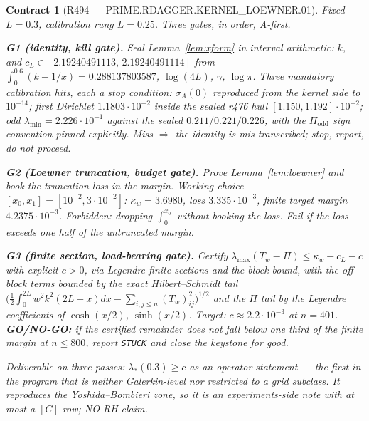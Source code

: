\documentclass[11pt]{article}
\newtheorem{contract}{Contract}
\theoremstyle{remark}
\begin{document}
\begin{contract}[R494 --- PRIME.RDAGGER.KERNEL\_LOEWNER.01]
Fixed $L=0.3$, calibration rung $L=0.25$.
Three gates, in order, A-first.

\textbf{G1 (identity, kill gate).}
Seal Lemma~\ref{lem:xform} in interval arithmetic:
$k$, and
$c_L\in[2.19240491113,\,2.19240491114]$
from $\int_0^{0.6}(k-1/x)=0.288137803587$,
$\log(4L)$, $\gamma$, $\log\pi$.
Three mandatory calibration hits, each a stop condition:
$\sigma_A(0)$ reproduced from the kernel side to $10^{-14}$;
first Dirichlet $1.1803\cdot10^{-2}$ inside the sealed r476
hull $[1.150,1.192]\cdot10^{-2}$;
odd $\lambda_{\min}=2.226\cdot10^{-1}$ against the sealed
$0.211/0.221/0.226$, with the $\Pi_{\mathrm{odd}}$ sign
convention pinned explicitly.
Miss $\Rightarrow$ the identity is mis-transcribed; stop, report,
do not proceed.

\textbf{G2 (Loewner truncation, budget gate).}
Prove Lemma~\ref{lem:loewner} and book the truncation loss in
the margin.  Working choice
$[x_0,x_1]=[10^{-2},3\cdot10^{-2}]$:
$\kappa_w=3.6980$, loss $3.335\cdot10^{-3}$, finite target
margin $4.2375\cdot10^{-3}$.
Forbidden: dropping $\int_0^{x_0}$ without booking the loss.
Fail if the loss exceeds one half of the untruncated margin.

\textbf{G3 (finite section, load-bearing gate).}
Certify
$\lambda_{\max}(T_w-\Pi)\le\kappa_w-c_L-c$ with explicit
$c>0$, via Legendre finite sections and the block bound, with
the off-block terms bounded by the exact Hilbert--Schmidt tail
$\big(\tfrac12\int_0^{2L}w^2k^2(2L-x)dx
-\sum_{i,j\le n}(T_w)_{ij}^2\big)^{1/2}$
and the $\Pi$ tail by the Legendre coefficients of
$\cosh(x/2)$, $\sinh(x/2)$.
Target: $c\approx2.2\cdot10^{-3}$ at $n=401$.
\textbf{GO/NO-GO:} if the certified remainder does not fall
below one third of the finite margin at $n\le800$, report
\texttt{STUCK} and close the keystone for good.

Deliverable on three passes: $\lambda_*(0.3)\ge c$ as an
\emph{operator} statement --- the first in the program that is
neither Galerkin-level nor restricted to a grid subclass.
It reproduces the Yoshida--Bombieri zone, so it is an
experiments-side note with at most a $[C]$ row; NO RH claim.
\end{contract}
\end{document}
